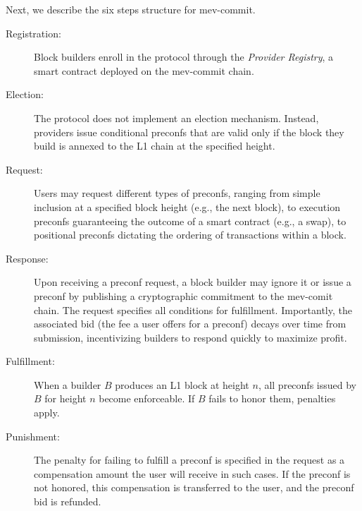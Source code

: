 \documentclass[a4paper]{article}
\theoremstyle{boldstyle}
\begin{document}
Next, we describe the six steps structure for mev-commit.


\begin{description}
    \item[Registration:] Block builders enroll in the protocol through the \emph{Provider Registry}, a smart contract deployed on the mev-commit chain.
    
    \item[Election:] The protocol does not implement an election mechanism. Instead, providers issue conditional preconfs that are valid only if the block they build is annexed to the L1 chain at the specified height.
    
    \item[Request:] Users may request different types of preconfs, ranging from simple inclusion at a specified block height (e.g., the next block), to execution preconfs guaranteeing the outcome of a smart contract (e.g., a swap), to positional preconfs dictating the ordering of transactions within a block.
    
    \item[Response:] Upon receiving a preconf request, a block builder may ignore it or issue a preconf by publishing a cryptographic commitment to the mev-comit chain. The request specifies all conditions for fulfillment. Importantly, the associated bid (the fee a user offers for a preconf) decays over time from submission, incentivizing builders to respond quickly to maximize profit.
    
    \item[Fulfillment:] When a builder $B$ produces an L1 block at height $n$, all preconfs issued by $B$ for height $n$ become enforceable. If $B$ fails to honor them, penalties apply.
    
    \item[Punishment:] The penalty for failing to fulfill a preconf is specified in the request as a compensation amount the user will receive in such cases. If the preconf is not honored, this compensation is transferred to the user, and the preconf bid is refunded.
\end{description}




\end{document}
